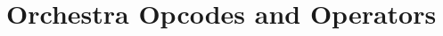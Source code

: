 \begin{comment}
\documentclass[10pt]{article}
\usepackage{fullpage, graphicx, url}
\setlength{\parskip}{1ex}
\setlength{\parindent}{0ex}
\title{Orchestra Opcodes and Operators}



\begin{tabular}{ccc}
The Alternative Csound Reference Manual & & \\
Previous & &Next

\end{tabular}

\end{comment}
\section{Orchestra Opcodes and Operators}


\begin{comment}
\begin{tabular}{lcr}
Previous &Home &Next \\
Reference &Up &!=

\end{tabular}



\end{comment}
